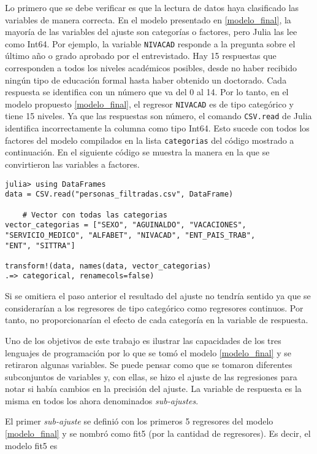 Lo primero que se debe verificar es que la lectura de datos haya clasificado las variables de manera correcta. En el modelo presentado en \ref{modelo_final}, la mayoría de las variables del ajuste son categorías o factores, pero \textsf{Julia} las lee como \textsf{Int64}. Por ejemplo, la variable \texttt{NIVACAD} responde a la pregunta sobre el último año o grado aprobado por el entrevistado. Hay 15 respuestas que corresponden a todos los niveles académicos posibles, desde no haber recibido ningún tipo de educación formal hasta haber obtenido un doctorado. Cada respuesta se identifica con un número que va del 0 al 14. Por lo tanto, en el modelo propuesto \ref{modelo_final}, el regresor \texttt{NIVACAD} es de tipo categórico y tiene 15 niveles. Ya que las respuestas son número, el comando \texttt{CSV.read} de \textsf{Julia} identifica incorrectamente la columna como tipo \textsf{Int64}. Esto sucede con todos los factores del modelo compilados en la lista \texttt{categorias} del código mostrado a continuación. En el siguiente código se muestra la manera en la que se convirtieron las variables a factores. 

\begin{verbatim}
julia> using DataFrames
data = CSV.read("personas_filtradas.csv", DataFrame)

	# Vector con todas las categorias
vector_categorias = ["SEXO", "AGUINALDO", "VACACIONES", 
"SERVICIO_MEDICO", "ALFABET", "NIVACAD", "ENT_PAIS_TRAB", 
"ENT", "SITTRA"]

transform!(data, names(data, vector_categorias) 
.=> categorical, renamecols=false)
\end{verbatim}

Si se omitiera el paso anterior el resultado del ajuste no tendría sentido ya que se considerarían a los regresores de tipo categórico como regresores continuos. Por tanto, no proporcionarían el efecto de cada categoría en la variable de respuesta.

Uno de los objetivos de este trabajo es ilustrar las capacidades de los tres lenguajes de programación por lo que se tomó el modelo \ref{modelo_final} y se retiraron algunas variables. Se puede pensar como que se tomaron diferentes subconjuntos de variables y, con ellas, se hizo el ajuste de las regresiones para notar si había cambios en la precisión del ajuste. La variable de respuesta es la misma en todos los ahora denominados \textit{sub-ajustes}.

El primer \textit{sub-ajuste} se definió con los primeros 5 regresores del modelo \ref{modelo_final} y se nombró como \textsf{fit5} (por la cantidad de regresores). Es decir, el modelo \textsf{fit5} es 

